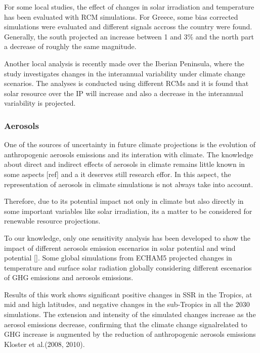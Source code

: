 For some local studies, the effect of changes in solar irradiation and temperature has been evaluated with RCM simulations. For Greece, some bias corrected simulations were evaluated and different signals accross the country were found. Generally, the south projected an increase between 1 and 3$\%$ and the north part a decrease of roughly the same magnitude. 

Another local analysis is recently made over the Iberian Peninsula, where the study investigates changes in the interannual variability under climate change scenarios. The analyses is conducted using different RCMs and it is found that solar resource over the IP will increase and also a decrease in the interannual variability is projected.

\subsubsection{Aerosols}

One of the sources of uncertainty in future climate projections is the evolution of anthropogenic aerosols emissions and its interation with climate. The knowledge about direct and indirect effects of aerosols in climate remains little known in some aspects [ref] and a it deserves still research effor. In this aspect, the representation of aerosols in climate simulations is not always take into account.  

Therefore, due to its potential impact not only in climate but also directly in some important variables like solar irradiation, its a matter to be considered for renewable resource projections.

To our knowledge, only one sensitivity analysis has been developed to show the impact of different aerosols emission escenarios in solar potential and wind potential []. Some global simulations from ECHAM5 projected changes in temperature and surface solar radiation globally considering different escenarios of GHG emissions and aerosols emissions. 

Results of this work shows significant positive changes in SSR in the Tropics, at mid and high latitudes, and negative changes in the sub-Tropics in all the 2030 simulations. The extension and intensity of the simulated changes increase as the aerosol emissions decrease, confirming that the climate change signalrelated to GHG increase is augmented by the reduction of anthropogenic aerosols emissions Kloster et al.(2008, 2010).


